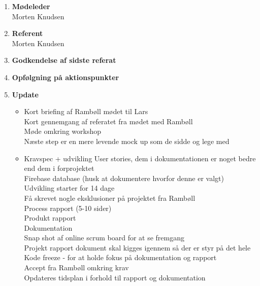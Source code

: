 	\begin{enumerate}
		\itemsep 0.3em 
		\item \textbf{Mødeleder}\\
			Morten Knudsen
		\item \textbf{Referent}\\
			Morten Knudsen
		\item \textbf{Godkendelse af sidste referat}
			
		\item\textbf{Opfølgning på aktionspunkter}

		\item \textbf{Update}
			\begin{itemize}[-]
			\item Kort briefing af Rambøll mødet til Lars\\
			Kort gennemgang af referatet fra mødet med Rambøll	\\
			Møde omkring workshop \\
			Næste step er en mere levende mock up som de sidde og lege med \\
		
			
			\item Kravspec + udvikling
			User stories, dem i dokumentationen er noget bedre end dem i forprojektet \\
			Firebase database (husk at dokumentere hvorfor denne er valgt) \\
			Udvikling starter for 14 dage \\
			Få skrevet nogle eksklusioner på projektet fra Rambøll \\
			
			Process rapport (5-10 sider) \\
			Produkt rapport \\
			Dokumentation \\
			
			Snap shot af online scrum board for at se fremgang \\
			
			Projekt rapport dokument skal kigges igennem så der er styr på det hele \\
			
			Kode freeze - for at holde fokus på dokumentation og rapport \\
			
			Accept fra Rambøll omkring krav \\
			
			Opdateres tidsplan i forhold til rapport og dokumentation \\
			

\end{itemize}
\end{enumerate}
